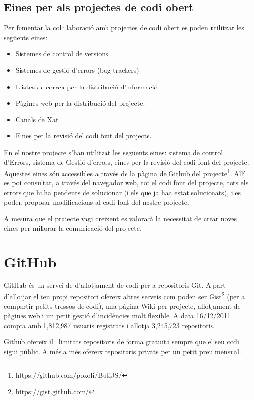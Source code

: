 \subsection{Eines per als projectes de codi obert}

Per fomentar la col·laboració amb projectes de codi obert es poden utilitzar les següents eines: 

\begin{itemize}
\item{Sistemes de control de versions}
\item{Sistemes de gestió d'errors (bug trackers)}
\item{Llistes de correu per la distribució d'informació.}
\item{Pàgines web per la distribució del projecte.}
\item{Canals de Xat}
\item{Eines per la revisió del codi font del projecte.}
\end{itemize}

En el nostre projecte s'han utilitzat les següents eines: sistema de control d'Errors, sistema de Gestió d'errors, eines per la revisió del codi font del projecte. Aquestes eines són accessibles a través de la pàgina de Github del projecte\footnote{\url{https://github.com/pokoli/ButiJS/}}. Allí es pot consultar, a través del navegador web, tot el codi font del projecte, tots els errors que hi ha pendents de solucionar (i els que ja han estat solucionats), i es poden proposar modificacions al codi font del nostre projecte. 

A mesura que el projecte vagi creixent es valorarà la necessitat de crear noves eines per millorar la comunicació del projecte. 

\section{GitHub}

GitHub és un servei de d'allotjament de codi per a repositoris Git. A part d'allotjar el teu propi repositori ofereix altres serveis com poden ser Gist\footnote{\url{https://gist.github.com/}} (per a compartir petits trossos de codi), una pàgina Wiki per projecte, allotjament de pàgines web i un petit gestió d'incidències molt flexible. A data 16/12/2011 compta amb 1,812,987 usuaris registrats i allotja 3,245,723 repositoris.

Github ofereix il·limitats repositoris de forma gratuïta sempre que el seu codi sigui públic. A més a més ofereix repositoris privats per un petit preu mensual. 

